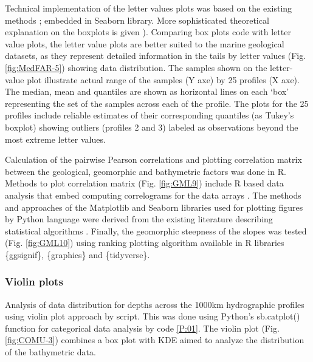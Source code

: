 \documentclass[11pt,a4paper]{report}
\begin{document}
{Technical implementation of the letter values plots was based on the existing methods \cite{Hofmannetal2011}; \cite{Hoaglin1983} embedded in Seaborn library. More sophisticated theoretical explanation on the boxplots is given \cite{McGilletal1978}). Comparing box plots code with letter value plots, the letter value plots are better suited to the marine geological datasets, as they represent detailed information in the tails by letter values (Fig. \ref{fig:MedFAR-5}) showing data distribution. The samples shown on the letter-value plot illustrate actual range of the samples (Y axe) by 25 profiles (X axe). The median, mean and quantiles are shown as horizontal lines on each ‘box’ representing the set of the samples across each of the profile. The plots for the 25 profiles include reliable estimates of their corresponding quantiles (as Tukey’s boxplot) showing outliers (profiles 2 and 3) labeled as observations beyond the most extreme letter values. 

Calculation of the pairwise Pearson correlations and plotting correlation matrix between the geological, geomorphic and bathymetric factors was done in R. Methods to plot correlation matrix (Fig. \ref{fig:GML9}) include R based data analysis that embed computing correlograms for the data arrays \cite{GolubVanLoan1996}. The methods and approaches of the Matplotlib and Seaborn libraries used for plotting figures by Python language were derived from the existing literature describing statistical algorithms \cite{Hunteretal2018}. Finally, the geomorphic steepness of the slopes was tested (Fig. \ref{fig:GML10}) using ranking plotting algorithm available in R libraries \{ggsignif\}, \{graphics\} and \{tidyverse\}. 

\subsubsection{Violin plots}\label{ssec:Py02}
Analysis of data distribution for depths across the 1000km hydrographic profiles using violin plot approach by script. This was done using Python’s sb.catplot() function for categorical data analysis by code \ref{P:01}. The violin plot (Fig. \ref{fig:COMU-3}) combines a box plot with \ac{KDE} aimed to analyze the distribution of the bathymetric data. 

}
\end{document}
